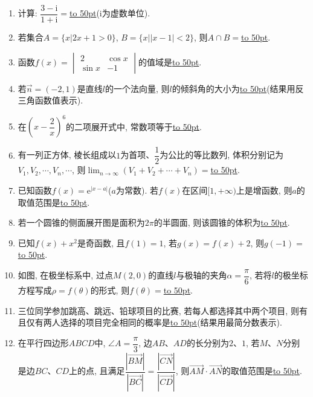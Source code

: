 \documentclass[10pt,a4paper]{article}
\newcommand{\blank}[1]{\underline{\hbox to #1pt{}}}
\begin{document}
\begin{enumerate}[1.]
\item 计算: $\dfrac{3-\mathrm{i}}{1+\mathrm{i}}=$\blank{50}($\mathrm{i}$为虚数单位).
\item 若集合$A=\{x|2x+1>0\}$, $B=\{x||x-1|<2\}$, 则$A\cap B=$\blank{50}.
\item 函数$f(x)=\begin{vmatrix} 2 & \cos x \\ \sin x & -1\end{vmatrix}$的值域是\blank{50}.
\item 若$\overrightarrow{n}=(-2,1)$是直线$l$的一个法向量, 则$l$的倾斜角的大小为\blank{50}(结果用反三角函数值表示).
\item 在$(x-\dfrac 2x)^6$的二项展开式中, 常数项等于\blank{50}.
\item 有一列正方体, 棱长组成以$1$为首项、$\dfrac 12$为公比的等比数列, 体积分别记为$V_1,V_2,\cdots,V_n,\cdots$, 则$\displaystyle\lim_{n\to\infty}(V_1+V_2+\cdots+V_n)=$\blank{50}.
\item 已知函数$f(x)=\mathrm{e}^{|x-a|}$($a$为常数). 若$f(x)$在区间$[1,+\infty)$上是增函数, 则$a$的取值范围是\blank{50}.
\item 若一个圆锥的侧面展开图是面积为$2\pi$的半圆面, 则该圆锥的体积为\blank{50}.
\item 已知$f(x)+x^2$是奇函数, 且$f(1)=1$, 若$g(x)=f(x)+2$, 则$g(-1)=$\blank{50}.
\item 如图, 在极坐标系中, 过点$M(2,0)$的直线$l$与极轴的夹角$\alpha=\dfrac \pi 6$, 若将$l$的极坐标方程写成$\rho = f(\theta)$的形式, 则$f(\theta)=$\blank{50}.
\begin{center}
\end{center}
\item 三位同学参加跳高、跳远、铅球项目的比赛, 若每人都选择其中两个项目, 则有且仅有两人选择的项目完全相同的概率是\blank{50}(结果用最简分数表示).
\item 在平行四边形$ABCD$中, $\angle A=\dfrac \pi 3$, 边$AB$、$AD$的长分别为$2$、$1$, 若$M$、$N$分别是边$BC$、$CD$上的点, 且满足$\dfrac{|\overrightarrow{BM}|}{|\overrightarrow{BC}|}=\dfrac{|\overrightarrow{CN}|}{|\overrightarrow{CD}|}$, 则$\overrightarrow{AM}\cdot \overrightarrow{AN}$的取值范围是\blank{50}.

\end{enumerate}
\end{document}
